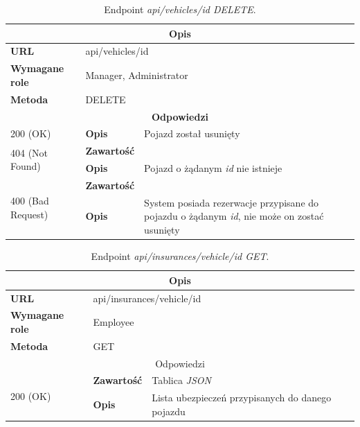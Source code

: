 \documentclass[eng,printmode,openany]{mgr}
\begin{document}
\begin{table}[H]
	\caption{Endpoint \textit{api/vehicles/id DELETE}.}
	\begin{tabularx}{\textwidth}{|l|l|X|}
		\hline
		\multicolumn{3}{|c|}{\textbf{\textbf{Opis}}}
		\\ \hline
		\textbf{URL}                       & \multicolumn{2}{l|}{api/vehicles/id}
		\\ \hline
		\textbf{Wymagane role}             & \multicolumn{2}{l|}{Manager, Administrator}
		\\ \hline
		\textbf{Metoda}                    & \multicolumn{2}{l|}{DELETE}
		\\ \hline
		\multicolumn{3}{|c|}{\textbf{Odpowiedzi}}
		\\ \hline
		200 (OK)			                & \textbf{Opis}         	& Pojazd został usunięty
		\\ \hline
		\multirow{2}{*}{404 (Not Found)} 	& \textbf{Zawartość}     &    	
		\\ \cline{2-3}                      & \textbf{Opis}          & Pojazd o żądanym \textit{id} nie istnieje
		\\ \hline
		\multirow{2}{*}{400 (Bad Request)} 	& \textbf{Zawartość}     &    	
		\\ \cline{2-3}                      & \textbf{Opis}          & System posiada rezerwacje przypisane do pojazdu o żądanym \textit{id}, nie może on zostać usunięty
		\\ \hline
	\end{tabularx}
\end{table}

\begin{table}[H]
	\caption{Endpoint \textit{api/insurances/vehicle/id GET}.}
	\begin{tabularx}{\textwidth}{|l|l|X|}
		\hline
		\multicolumn{3}{|c|}{\textbf{\textbf{Opis}}}
		\\ \hline
		\textbf{URL}                         & \multicolumn{2}{l|}{api/insurances/vehicle/id}
		\\ \hline
		\textbf{Wymagane role}               & \multicolumn{2}{l|}{Employee}
		\\ \hline
		\textbf{Metoda}                      & \multicolumn{2}{l|}{GET}
		\\ \hline
		\multicolumn{3}{|c|}{ Odpowiedzi}
		\\ \hline
		\multirow{2}{*}{200 (OK)}   & \textbf{Zawartość}         & Tablica \textit{JSON}
		\\ \cline{2-3}              & \textbf{Opis}         	    & Lista ubezpieczeń przypisanych do danego pojazdu
		\\ \hline
	\end{tabularx}
\end{table}
\end{document}
